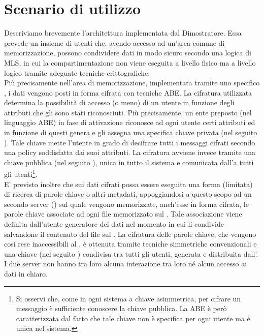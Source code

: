 \documentclass[a4paper,twoside,10pt,openany]{scrbook}
\begin{document}
\section{Scenario di utilizzo}
Descriviamo brevemente l'architettura implementata dal Dimostratore.
Essa prevede un insieme di utenti che, avendo accesso ad un'area comune di memorizzazione, possono condividere dati in modo sicuro secondo una logica di \ac{MLS}, in cui la compartimentazione non viene eseguita a livello fisico ma a livello logico tramite adeguate tecniche crittografiche. \\
Più precisamente nell'area di memorizzazione, implementata tramite uno specifico \sa, i dati vengono posti in forma cifrata con tecniche \ac{ABE}. La cifratura utilizzata determina la possibilità di accesso (o meno) di un utente in funzione degli attributi che gli sono stati riconosciuti.
Più precisamente, un ente preposto (\auth nel linguaggio \ac{ABE}) in fase di attivazione riconosce ad ogni utente certi attributi ed in funzione di questi genera e gli assegna una specifica chiave privata (nel seguito \emph{\abesk}). Tale chiave mette l'utente in grado di decifrare tutti i messaggi cifrati secondo una policy soddisfatta dai suoi attributi. La cifratura avviene invece tramite una chiave pubblica (nel seguito \emph{\abepk}), unica in tutto il sistema e comunicata dall'\auth a tutti gli utenti\footnote{Si osservi che, come in ogni sistema a chiave asimmetrica, per cifrare un messaggio è sufficiente conoscere la chiave pubblica. La \ac{ABE} è però caratterizzata dal fatto che tale chiave non è specifica per ogni utente ma è unica nel sistema.}.\\ 
E' previsto inoltre che sui dati cifrati possa essere eseguita una forma (limitata) di ricerca di parole chiave o altri metadati, appoggiandosi a questo scopo ad un secondo server (\sr) sul quale vengono memorizzate, anch'esse in forma cifrata, le parole chiave associate ad ogni file memorizzato sul \sa. Tale associazione viene definita dall'utente generatore dei dati nel momento in cui li condivide salvandone il contenuto del file sul \sa. La cifratura delle parole chiave, che vengono così rese inaccessibili al \sr, è ottenuta tramite tecniche simmetriche convenzionali e una chiave (nel seguito \emph{\searchsk}) condivisa tra tutti gli utenti, generata e distribuita dall'\auth.
I due server non hanno tra loro alcuna interazione tra loro né alcun accesso ai dati in chiaro.\\
\end{document}
